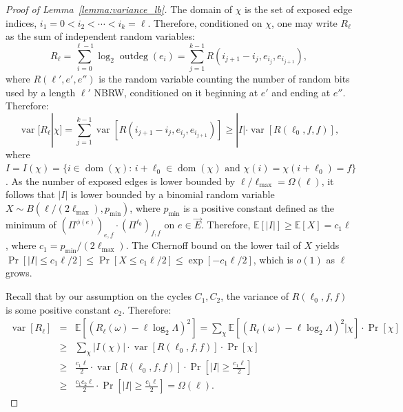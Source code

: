\documentclass[10pt,a4paper]{amsart}
\newcommand{\E}{\mathbb{E}} %
\newcommand{\dirE}{\vec{E}}
\DeclareMathOperator{\dom}{dom}
\DeclareMathOperator{\outdeg}{outdeg}
\DeclareMathOperator{\var}{var}
\begin{document}
\begin{proof}[Proof of Lemma~\ref{lemma:variance_lb}]
    The domain of $\chi$ is the set of exposed edge indices, $i_1=0 < i_2 < \cdots < i_k=\ell$.
    Therefore, conditioned on $\chi$, one may write $R_\ell$ as the sum of independent random variables:
    \begin{equation*}
        R_\ell = \sum_{i=0}^{\ell-1} \log_2 \outdeg(e_i) = \sum_{j=1}^{k-1} R(i_{j+1}-i_j,e_{i_j},e_{i_{j+1}}),
    \end{equation*}
    where $R(\ell',e',e'')$ is the random variable counting the number of random bits used by a length $\ell'$ NBRW, conditioned on it beginning at $e'$ and ending at $e''$.
    Therefore:
    \begin{equation*}
        \var[R_\ell | \chi]
           = \sum_{j=1}^{k-1} \var\!\left[R(i_{j+1}-i_j,e_{i_j},e_{i_{j+1}})\right]
           \geq |I| \cdot \var\!\left[R(\ell_0,f,f)\right],
    \end{equation*}
    where $I = I(\chi) = \{i \in  \dom(\chi) :\, i+\ell_0 \in \dom(\chi) \mbox{ and } \chi(i) = \chi(i+\ell_0) = f\}$.
    As the number of exposed edges is lower bounded by $\ell/\ell_{\max} = \Omega(\ell)$,
    it follows that $|I|$ is lower bounded by a binomial random variable $X \sim B(\ell/(2\ell_{\max}),p_{\min})$, 
    where $p_{\min}$ is a positive constant defined as the minimum of $(\Pi^{\phi(e)})_{e,f} \cdot (\Pi^{\ell_0})_{f,f}$ on $e \in \dirE$. 
    Therefore, $\E[|I|] \geq \E[X] = c_1 \ell$, where $c_1 = p_{\min}/(2 \ell_{\max})$.
    The Chernoff bound on the lower tail of $X$ yields $\Pr[|I| \leq c_1 \ell/2] \leq \Pr[X \leq c_1 \ell/2] \leq \exp[-c_1 \ell/2]$, which is $o(1)$ as $\ell$ grows.

    Recall that by our assumption on the cycles $C_1, C_2$, the variance of $R(\ell_0,f,f)$ is some positive constant $c_2$.
    Therefore:
    \begin{eqnarray*}
        \var[R_\ell]
        &=& \E\!\left[{(R_\ell(\omega) - \ell \log_2\Lambda)}^2\right]
        = \sum_\chi \E\!\left[{(R_\ell(\omega) - \ell \log_2\Lambda)}^2 \Big\vert \chi\right] \cdot \Pr[\chi] \\
        &\geq& \sum_\chi |I(\chi)| \cdot \var\!\left[R(\ell_0,f,f)\right] \cdot \Pr[\chi] \\
        &\geq& \frac{c_1 \ell}{2} \cdot \var\!\left[R(\ell_0,f,f)\right] \cdot \Pr\!\left[|I| \geq \frac{c_1 \ell}{2}\right] \\
        &\geq& \frac{c_1 c_2 \ell}{2} \cdot \Pr\!\left[|I| \geq \frac{c_1 \ell}{2}\right]
        = \Omega(\ell).
    \end{eqnarray*}
\end{proof}
\end{document}
